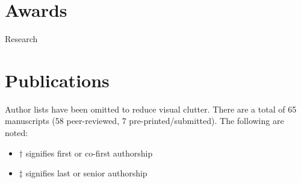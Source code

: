\documentclass[10pt,a4paper,sans]{moderncv} %
\begin{document}
\section{Awards}\label{sec:awards}

\vspace{5mm}

{\huge Research}

\section{Publications}\label{sec:publications}

Author lists have been omitted to reduce visual clutter.
There are a total of
65 manuscripts (58 peer-reviewed, 7 pre-printed/submitted).
The following are noted:

\begin{itemize}
\item $\dagger$ signifies first or co-first authorship
\item $\ddagger$ signifies last or senior authorship
\end{itemize}

\vspace{0.3cm}
\end{document}
